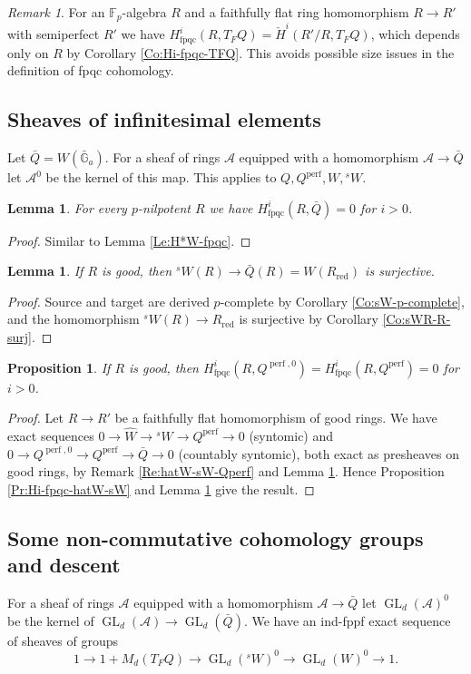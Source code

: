 \documentclass[a4paper,11pt]{amsart}
\theoremstyle{plain}
\newtheorem{Lemma}[equation]{Lemma}
\newtheorem{Prop}[equation]{Proposition}
\theoremstyle{definition}
\theoremstyle{remark}
\newtheorem{Remark}[equation]{Remark}
\newcommand{\bLe}{\begin{Lemma}}
\newcommand{\eLe}{\end{Lemma}}
\newcommand{\bPr}{\begin{Prop}}
\newcommand{\ePr}{\end{Prop}}
\newcommand{\bRe}{\begin{Remark}}
\newcommand{\eRe}{\end{Remark}}
\newcommand{\bproof}{\begin{proof}}
\newcommand{\eproof}{\end{proof}}
\newcommand{\beqn}{\begin{equation}}
\newcommand{\eeqn}{\end{equation}}
\numberwithin{equation}{section}
\newcommand{\AAA}{\mathcal{A}}
\newcommand{\FF}{{\mathbb{F}}}
\newcommand{\GG}{{\mathbb{G}}}
\DeclareMathOperator{\fpqc}{fpqc}
\DeclareMathOperator{\perf}{perf}
\DeclareMathOperator{\red}{red}
\DeclareMathOperator{\GL}{GL}
\newcommand{\limperf}{^{\perf}}
\newcommand{\sW}{{}^sW}
\begin{document}
\bRe
\label{Re:Hi-fpqc-TFQ}
For an $\FF_p$-algebra $R$ and a faithfully flat ring homomorphism $R\to R'$ with semiperfect $R'$ we have $H^i_{\fpqc}(R,T_FQ)=\check H^i(R'/R,T_FQ)$, which depends only on $R$ by Corollary \ref{Co:Hi-fpqc-TFQ}. This avoids possible size issues in the definition of fpqc  cohomology.
\eRe

\subsection{Sheaves of infinitesimal elements}

Let $\bar Q=W(\bar\GG_a)$.
For a sheaf of rings $\AAA$ equipped with a homomorphism $\AAA\to\bar Q$ let $\AAA^0$ be the kernel of this map. This applies to $Q,Q\limperf,W,\sW$.

\bLe
\label{Le:Hi-fpqc-barQ}
For every $p$-nilpotent $R$ we have $H^i_{\fpqc}(R,\bar Q)=0$ for $i>0$.
\eLe

\bproof
Similar to Lemma \ref{Le:H*W-fpqc}.
\eproof

\bLe
\label{Le:sWR-barQr-surj}
If $R$ is good, then $\sW(R)\to\bar Q(R)=W(R_{\red})$ is surjective.
\eLe

\bproof
Source and target are derived $p$-complete by Corollary \ref{Co:sW-p-complete},
and the homomorphism $\sW(R)\to R_{\red}$ is surjective by Corollary \ref{Co:sWR-R-surj}.
\eproof

\bPr
\label{Pr:Hi-Qperf-Qperf0}
If $R$ is good, then $H^i_{\fpqc}(R,Q^{\perf,0})=H^i_{\fpqc}(R,Q\limperf)=0$ for $i>0$.
\ePr

\bproof
Let $R\to R'$ be a faithfully flat homomorphism of good rings.
We have exact sequences $0\to\hat W\to\sW\to Q\limperf\to 0$ (syntomic) and $0\to Q^{\perf,0}\to Q\limperf\to\bar Q\to 0$ (countably syntomic), both exact as presheaves on good rings, by Remark \ref{Re:hatW-sW-Qperf} and Lemma \ref{Le:sWR-barQr-surj}. Hence Proposition \ref{Pr:Hi-fpqc-hatW-sW} and Lemma \ref{Le:Hi-fpqc-barQ} give the result.
\eproof

\subsection{Some non-commutative cohomology groups and descent}

For a sheaf of rings $\AAA$ equipped with a homomorphism $\AAA\to\bar Q$ let $\GL_d(\AAA)^0$ be the kernel of $\GL_d(\AAA)\to\GL_d(\bar Q)$. 
We have an ind-fppf exact sequence of sheaves of groups 
\beqn
\label{Eq:MdTFQ-GLdsW-GLdW}
1\to 1+M_d(T_FQ)\to\GL_d(\sW)^0\to\GL_d(W)^0\to 1.
\eeqn
\end{document}
